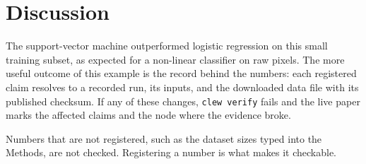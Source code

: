 \section{Discussion}

The support-vector machine outperformed logistic regression on this small
training subset, as expected for a non-linear classifier on raw pixels.
The more useful outcome of this example is the record behind the numbers:
each registered claim resolves to a recorded run, its inputs, and the
downloaded data file with its published checksum. If any of these changes,
\texttt{clew verify} fails and the live paper marks the affected claims and
the node where the evidence broke.

Numbers that are not registered, such as the dataset sizes typed into the
Methods, are not checked. Registering a number is what makes it checkable.

